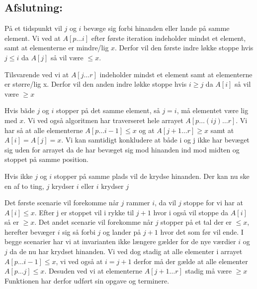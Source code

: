 \documentclass[10pt,a4paper,danish]{article}
\begin{document}
\subsection{Afslutning:}
\label{sec:afsl-it}
På et tidspunkt vil $j$ og $i$ bevæge sig forbi hinanden eller lande på samme element. 
Vi ved at $A[p \ldots i]$ efter første iteration indeholder mindst et element, samt at elementerne er mindre/lig $x$. Derfor vil den første indre løkke stoppe hvis $j \leq i$ da $A[j]$ så vil være $\leq x$.

Tilsvarende ved vi at $A[j \ldots r]$ indeholder mindst et element samt at elementerne er større/lig x. Derfor vil den anden indre løkke stoppe hvis $i \geq j$ da $A[i]$ så vil være $\geq x$

Hvis bãde $j$ og $i$ stopper på det samme element, så $j=i$, må elementet være lig med $x$. Vi ved også algoritmen har traverseret hele arrayet $A[p \ldots (ij) \ldots r]$. Vi har så at alle elementerne $A[p \ldots i-1] \leq x$ og at $A[j+1 \ldots r] \geq x$ samt at $A[i]=A[j]=x$.
Vi kan samtidigt konkludere at både i og j ikke har bevæget sig uden for arrayet da de har bevæget sig mod hinanden ind mod midten og stoppet på samme position.

Hvis ikke $j$ og $i$ stopper på samme plads vil de krydse hinanden.
Der kan nu ske en af to ting, $j$ krydser $i$ eller $i$ krydser $j$

Det første scenarie vil forekomme når $j$ rammer $i$, da vil $j$ stoppe for vi har at $A[i] \leq x$. Efter j er stoppet vil i rykke til $j+1$ hvor i også vil stoppe da $A[i]$ så er $\geq x$.
Det andet scenarie vil forekomme når $j$ stopper på et tal der er $\leq x$, herefter bevæger $i$ sig så forbi $j$ og lander på $j+1$ hvor det som før vil ende.
I begge scenarier har vi at invarianten ikke længere gælder for de nye værdier $i$ og $j$ da de nu har krydset hinanden. Vi ved dog stadig at alle elementer i arrayet $A[p \ldots i-1] \leq x$, vi ved også at $i = j+1$ derfor må der gælde at alle elementer $A[p \ldots j] \leq x$. Desuden ved vi at elementerne $A[j+1 \ldots r]$ stadig må være $\geq x$
Funktionen har derfor udført sin opgave og terminere. 
\end{document}

